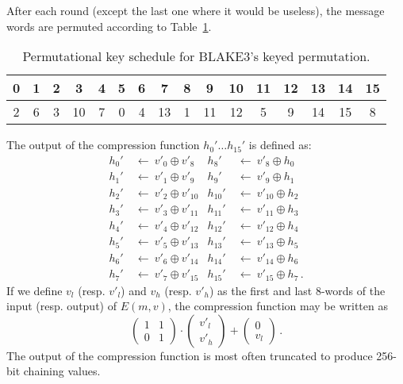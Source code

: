 \documentclass[11pt,notitlepage,a4paper]{article}
\begin{document}
After each round (except the last one where it would be useless), the message words are permuted according to Table~\ref{tab:perm}.

\begin{table}
  \centering
  \caption{Permutational key schedule for BLAKE3's keyed permutation.}\label{tab:perm}
  \begin{tabular}{cccccccccccccccc}
    \toprule
    0 & 1 & 2 & 3 & 4 & 5 & 6 & 7 & 8 & 9 & 10 & 11 & 12 & 13 & 14 & 15 \\ \midrule
    2 & 6 & 3 & 10 & 7 & 0 & 4 & 13 & 1 & 11 & 12 & 5 & 9 & 14 & 15 & 8 \\
    \bottomrule
  \end{tabular}
\end{table}

The output of the compression function $h_{0}' \ldots h_{15}'$ is
defined as:
\begin{align*}
h_{0}'  \ & \leftarrow \ v'_{0} \oplus  v'_{8} &
h_{8}'  \ & \leftarrow \ v'_{8} \oplus  h_{0} \\
h_{1}'  \ & \leftarrow \ v'_{1} \oplus  v'_{9} &
h_{9}'  \ & \leftarrow \ v'_{9} \oplus  h_{1} \\
h_{2}'  \ & \leftarrow \ v'_{2} \oplus  v'_{10} &
h_{10}' \ & \leftarrow \ v'_{10} \oplus  h_{2} \\
h_{3}'  \ & \leftarrow \ v'_{3} \oplus  v'_{11} &
h_{11}' \ & \leftarrow \ v'_{11} \oplus  h_{3} \\
h_{4}'  \ & \leftarrow \ v'_{4} \oplus  v'_{12} &
h_{12}' \ & \leftarrow \ v'_{12} \oplus  h_{4} \\
h_{5}'  \ & \leftarrow \ v'_{5} \oplus  v'_{13} &
h_{13}' \ & \leftarrow \ v'_{13} \oplus  h_{5} \\
h_{6}'  \ & \leftarrow \ v'_{6} \oplus  v'_{14} &
h_{14}' \ & \leftarrow \ v'_{14} \oplus  h_{6} \\
h_{7}'  \ & \leftarrow \ v'_{7} \oplus  v'_{15} &
h_{15}' \ & \leftarrow \ v'_{15} \oplus  h_{7}\,.
\end{align*}
If we define $v_l$ (resp. $v'_l$) and $v_h$ (resp. $v'_h$) as the first and last 8-words of the input (resp. output) of $E(m, v)$, the compression function may be written as
\[
  \begin{pmatrix}
    1 & 1 \\
    0 & 1
  \end{pmatrix}\cdot%
  \begin{pmatrix}
  v'_l \\ v'_h
  \end{pmatrix} + 
  \begin{pmatrix}
   0 \\ v_l
  \end{pmatrix}\,.
\]
The output of the compression function is most often truncated to produce 256-bit chaining values. %
\end{document}
